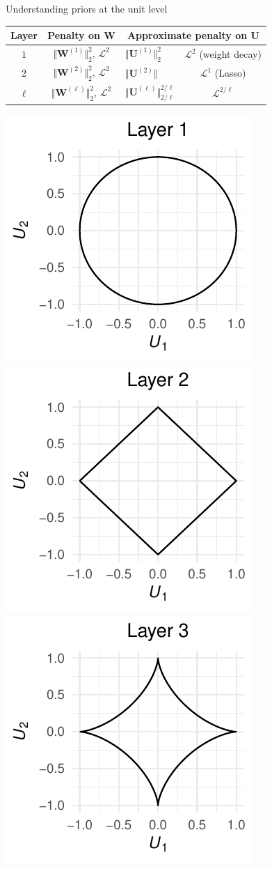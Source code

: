 \documentclass[9pt]{beamer}
\begin{document}
\begin{frame}{Understanding priors at the unit level}


\def\bW{\boldsymbol{W}}
\def\bU{\boldsymbol{U}}
\def\Lnorm{\mathcal{L}}

\begin{center}
\begin{tabular}{@{}cclc@{}}
\toprule
Layer                         & Penalty on $\bW$         & \multicolumn{2}{c}{Approximate penalty on $\bU$}         \\ \toprule
$1$ & $\Vert \bW^{(1)}\Vert_2^{2}$, $\Lnorm^2$   & $\Vert \bU^{(1)}\Vert_2^{2}$ & $\Lnorm^2$  (weight decay)\\%
$2$ & $\Vert \bW^{(2)}\Vert_2^{2}$, $\Lnorm^2$   & $\Vert \bU^{(2)}\Vert$ & $\Lnorm^1$  (Lasso)\\%
$\ell$ & $\Vert \bW^{(\ell)}\Vert_2^{2}$, $\Lnorm^2$   & $\Vert \bU^{(\ell)}\Vert_{2/\ell}^{2/\ell}$ & $\Lnorm^{2/\ell}$ \\ 
\bottomrule
\end{tabular}\bigskip 

  \includegraphics[width=.32\textwidth]{figures_julyan/bdl/001}
  \includegraphics[width=.32\textwidth]{figures_julyan/bdl/002}
  \includegraphics[width=.32\textwidth]{figures_julyan/bdl/003}

\end{center}

\end{frame}
\end{document}
